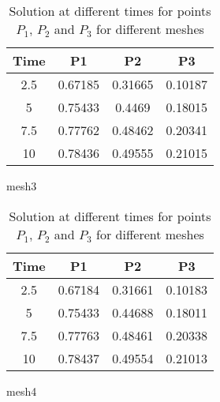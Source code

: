\begin{table}[htbp]
\begin{subtable}{0.45\linewidth}
    \end{subtable}
    \hfill
    \begin{subtable}{0.45\linewidth}
        \centering
        \begin{tabular}{cccc}
            \hline
            \textbf{Time} & \textbf{P1} & \textbf{P2} & \textbf{P3} \\
            \hline
            2.5 & 0.67185 & 0.31665 & 0.10187 \\
            5   & 0.75433 & 0.4469  & 0.18015 \\
            7.5 & 0.77762 & 0.48462 & 0.20341 \\
            10  & 0.78436 & 0.49555 & 0.21015 \\
            \hline
        \end{tabular}
        \caption{mesh3}
        \label{subtab: mesh3}
    \end{subtable}
    \hfill
    \begin{subtable}{0.45\linewidth}
        \centering
        \begin{tabular}{cccc}
            \hline
            \textbf{Time} & \textbf{P1} & \textbf{P2} & \textbf{P3} \\
            \hline
            2.5 & 0.67184 & 0.31661 & 0.10183 \\
            5   & 0.75433 & 0.44688 & 0.18011 \\
            7.5 & 0.77763 & 0.48461 & 0.20338 \\
            10  & 0.78437 & 0.49554 & 0.21013 \\
            \hline
        \end{tabular}
        \caption{mesh4}
        \label{subtab: mesh4}
    \end{subtable}
    
    \caption{Solution at different times for points $P_1$, $P_2$ and $P_3$ for different meshes}
    \label{tab: data_point}
\end{table}



